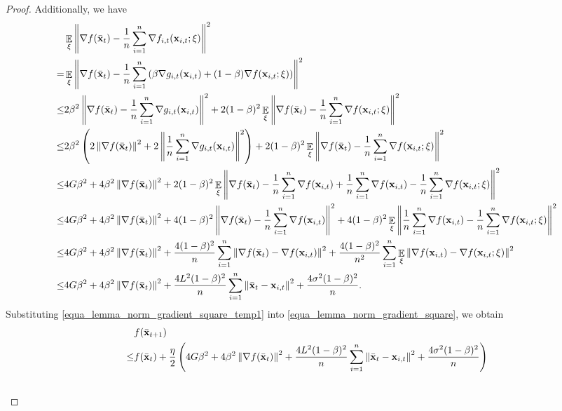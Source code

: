 \documentclass{article}
\begin{document}
\begin{proof}
Additionally, we have
\begin{align}
\nonumber
& \mathop{\mathbb{E}}_{\xi}\left\lVert\nabla f(\bar{{\bf x}}_t) -\frac{1}{n}\sum_{i=1}^n \nabla f_{i,t}({\bf x}_{i,t};\xi)\right\rVert^2 \\ \nonumber
= & \mathop{\mathbb{E}}_{\xi}\left\lVert\nabla f(\bar{{\bf x}}_t) -\frac{1}{n}\sum_{i=1}^n \left( \beta \nabla g_{i,t}({\bf x}_{i,t}) + (1-\beta) \nabla f({\bf x}_{i,t};\xi)  \right)\right\rVert^2 \\ \nonumber
\le & 2\beta^2 \left\lVert\nabla f(\bar{{\bf x}}_t) -\frac{1}{n}\sum_{i=1}^n \nabla g_{i,t}({\bf x}_{i,t})  \right\rVert^2 + 2(1-\beta)^2 \mathop{\mathbb{E}}_{\xi}\left\lVert \nabla f(\bar{{\bf x}}_t) - \frac{1}{n}\sum_{i=1}^n \nabla f({\bf x}_{i,t};\xi) \right\rVert^2\\ \nonumber
\le & 2\beta^2\left( 2\left\lVert\nabla f(\bar{{\bf x}}_t)\right\rVert^2 + 2\left\lVert\frac{1}{n}\sum_{i=1}^n \nabla g_{i,t}({\bf x}_{i,t})  \right\rVert^2 \right) + 2(1-\beta)^2 \mathop{\mathbb{E}}_{\xi}\left\lVert \nabla f(\bar{{\bf x}}_t) - \frac{1}{n}\sum_{i=1}^n \nabla f({\bf x}_{i,t};\xi) \right\rVert^2\\ \nonumber
\le & 4G\beta^2 + 4\beta^2 \left\lVert\nabla f(\bar{{\bf x}}_t)\right\rVert^2 + 2(1-\beta)^2 \mathop{\mathbb{E}}_{\xi}\left\lVert \nabla f(\bar{{\bf x}}_t) - \frac{1}{n}\sum_{i=1}^n \nabla f({\bf x}_{i,t}) + \frac{1}{n}\sum_{i=1}^n \nabla f({\bf x}_{i,t}) - \frac{1}{n}\sum_{i=1}^n \nabla f({\bf x}_{i,t};\xi) \right\rVert^2\\ \nonumber
\le & 4G\beta^2 + 4\beta^2 \left\lVert\nabla f(\bar{{\bf x}}_t)\right\rVert^2 + 4(1-\beta)^2 \left\lVert \nabla f(\bar{{\bf x}}_t) - \frac{1}{n}\sum_{i=1}^n \nabla f({\bf x}_{i,t})\right\rVert^2 + 4(1-\beta)^2 \mathop{\mathbb{E}}_{\xi}\left\lVert\frac{1}{n}\sum_{i=1}^n \nabla f({\bf x}_{i,t}) - \frac{1}{n}\sum_{i=1}^n \nabla f({\bf x}_{i,t};\xi) \right\rVert^2\\ \nonumber
\le & 4G\beta^2 + 4\beta^2 \left\lVert\nabla f(\bar{{\bf x}}_t)\right\rVert^2 +  \frac{4(1-\beta)^2}{n}\sum_{i=1}^n\left\lVert \nabla f(\bar{{\bf x}}_t) -  \nabla f({\bf x}_{i,t}) \right\rVert^2 + \frac{4(1-\beta)^2}{n^2}\sum_{i=1}^n \mathop{\mathbb{E}}_{\xi}\left\lVert\nabla f({\bf x}_{i,t}) - \nabla f({\bf x}_{i,t};\xi) \right\rVert^2\\ \label{equa_lemma_norm_gradient_square_temp1}
\le & 4G\beta^2 + 4\beta^2 \left\lVert\nabla f(\bar{{\bf x}}_t)\right\rVert^2 +  \frac{4L^2(1-\beta)^2}{n}\sum_{i=1}^n\left\lVert\bar{{\bf x}}_t - {\bf x}_{i,t} \right\rVert^2 + \frac{4\sigma^2(1-\beta)^2}{n}.
\end{align}
Substituting \eqref{equa_lemma_norm_gradient_square_temp1} into \eqref{equa_lemma_norm_gradient_square}, we obtain
\begin{align}
\nonumber
& f(\bar{\x}_{t+1}) \\ \nonumber
\le & f(\bar{\x}_t) + \frac{\eta}{2}\lrincir{4G\beta^2 + 4\beta^2 \lrnorm{\nabla f(\bar{\x}_t)}^2 +  \frac{4L^2(1-\beta)^2}{n}\sum_{i=1}^n\lrnorm{\bar{\x}_t - \x_{i,t} }^2 + \frac{4\sigma^2(1-\beta)^2}{n}} \\ \nonumber 

\end{align}
\end{proof}
\end{document}
